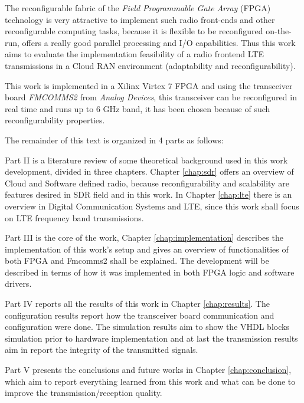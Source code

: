 The reconfigurable fabric of the \textit{Field Programmable Gate Array} (FPGA)
technology is very attractive to implement such radio front-ends and other
reconfigurable computing tasks, because it is flexible to be reconfigured
on-the-run, offers a really good parallel processing and I/O capabilities. Thus
this work aims to evaluate the implementation feasibility of a radio frontend
LTE transmissions in a Cloud RAN environment (adaptability and
reconfigurability).

This work is implemented in a Xilinx Virtex 7 FPGA and using the transceiver
board \textit{FMCOMMS2} from \textit{Analog Devices}, this transceiver can be
reconfigured in real time and runs up to 6 GHz band, it has been chosen because
of such reconfigurability properties.

The remainder of this text is organized in 4 parts as follows:

Part II is a literature review of some theoretical background used in this work
development, divided in three chapters. Chapter \ref{chap:sdr} offers an
overview of Cloud and Software defined radio, because reconfigurability and
scalability are features desired in SDR field and in this work. In Chapter
\ref{chap:lte} there is an overview in Digital Communication Systems and LTE,
since this work shall focus on LTE  frequency band transmissions.

Part III is the core of the work, Chapter \ref{chap:implementation} describes
the implementation of this work's setup and gives an overview of functionalities
of both FPGA and Fmcomms2 shall be explained. The development will be described
in terms of how it was implemented in both FPGA logic and software drivers.

Part IV reports all the results of this work in Chapter
\ref{chap:results}. The configuration results report how the transceiver board
communication and configuration were done. The simulation results aim to show
the VHDL blocks simulation prior to hardware implementation and at last the
transmission results aim in report the integrity of the transmitted signals.

Part V presents the conclusions and future works in Chapter
\ref{chap:conclusion}, which aim to report everything learned from this work and
what can be done to improve the transmission/reception quality.
